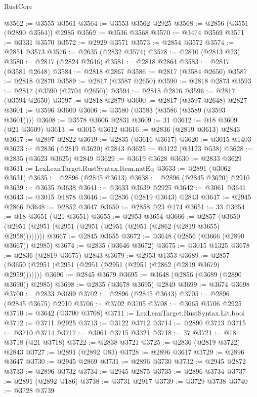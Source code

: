 \begin{lexlean}{RustCore}
\begin{coremodule}
@3562 := @3555 @3561
@3564 := @3553 @3562 @2925
@3568 := @2856 (@3551 (@2890 @3564)) @2985
@3569 := @3536 @3568
@3570 := @3474 @3569
@3571 := @3331 @3570
@3572 := @2929 @3571
@3573 := @2854 @3572
@3574 := @2851 @3573
@3576 := @2635 (@2832 @3574)
@3578 := @2810 (@2813 @23)
@3580 := @2817 (@2824 @2646)
@3581 := @2818 @2864
@3583 := @2817 (@3581 @2648)
@3584 := @2818 @2867
@3586 := @2817 (@3584 @2650)
@3587 := @2818 @2870
@3589 := @2817 (@3587 @2650)
@3590 := @2818 @2873
@3593 := @2817 (@3590 (@2704 @2650))
@3594 := @2818 @2876
@3596 := @2817 (@3594 @2650)
@3597 := @2818 @2879
@3600 := @2817 (@3597 @2648) @2827
@3601 := @3596 @3600
@3606 := @3580 (@3583 (@3586 (@3589 (@3593 @3601))))
@3608 := @3578 @3606 @2831
@3609 := 31
@3612 := @18 @3609 (@21 @3609)
@3613 := @3015 @3612
@3616 := @2836 (@2819 @3613) @2843
@3617 := @2897 @2822
@3619 := @2835 (@3616 @3617)
@3620 := @3015 @1403
@3623 := @2836 (@2819 @3620) @2843
@3625 := @3122 (@3123 @538)
@3628 := @2835 (@3623 @3625) @2849
@3629 := @3619 @3628
@3630 := @2833 @3629
@3631 := LexLeanTarget.RustSyntax.Item.natEq
@3633 := @2891 (@3062 @3631)
@3635 := @2896 (@2845 @3613)
@3638 := @2896 (@2845 @3620) @2910
@3639 := @3635 @3638
@3641 := @3633 @3639 @2925
@3642 := @3061 @3641
@3643 := @3015 @1878
@3646 := @2836 (@2819 @3643) @2843
@3647 := @2945 @2866
@3648 := @2852 @3647
@3650 := @2858 @23 @174
@3651 := 33
@3654 := @18 @3651 (@21 @3651)
@3655 := @2953 @3654
@3666 := @2857 (@3650 (@2951 (@2951 (@2951 (@2951 (@2951 (@2951 (@2862 (@2819 @3655) @2958))))))))
@3667 := @2845 @3655
@3672 := @3648 (@2856 (@3666 (@2890 @3667)) @2985)
@3674 := @2835 (@3646 @3672)
@3675 := @3015 @1325
@3678 := @2836 (@2819 @3675) @2843
@3679 := @2953 @1353
@3689 := @2857 (@3650 (@2951 (@2951 (@2951 (@2951 (@2951 (@2862 (@2819 @3679) @2959)))))))
@3690 := @2845 @3679
@3695 := @3648 (@2856 (@3689 (@2890 @3690)) @2985)
@3698 := @2835 (@3678 @3695) @2849
@3699 := @3674 @3698
@3700 := @2833 @3699
@3702 := @2896 (@2845 @3643)
@3705 := @2896 (@2845 @3675) @2910
@3706 := @3702 @3705
@3708 := @3065 @3706 @2925
@3710 := @3642 (@3700 @3708)
@3711 := LexLeanTarget.RustSyntax.Lit.bool
@3712 := @3711 @2925
@3713 := @3122 @3712
@3714 := @2890 @3713
@3715 := @3710 @3714
@3717 := @3061 @3715 @3321
@3718 := 37
@3721 := @18 @3718 (@21 @3718)
@3722 := @2838 @3721
@3725 := @2836 (@2819 @3722) @2843
@3727 := @2891 (@2892 @83)
@3728 := @2896 @3617
@3729 := @2896 @3647
@3730 := @2945 @2869
@3731 := @2896 @3730
@3732 := @2945 @2872
@3733 := @2896 @3732
@3734 := @2945 @2875
@3735 := @2896 @3734
@3737 := @2891 (@2892 @186)
@3738 := @3731 @2917
@3739 := @3729 @3738
@3740 := @3728 @3739

\end{coremodule}
\end{lexlean}
